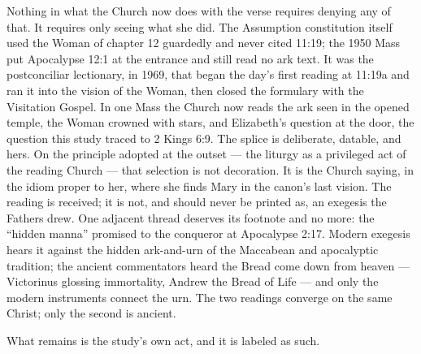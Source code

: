 Nothing in what the Church now does with the verse requires denying any of
that. It requires only seeing what she did. The Assumption constitution
itself used the Woman of chapter 12 guardedly and never cited 11:19; the
1950 Mass put Apocalypse 12:1 at the entrance and still read no ark text.
It was the postconciliar lectionary, in 1969, that began the day's first
reading at 11:19a and ran it into the vision of the Woman, then closed the
formulary with the Visitation Gospel. In one Mass the Church now reads the
ark seen in the opened temple, the Woman crowned with stars, and
Elizabeth's question at the door, the question this study traced to 2 Kings
6:9. The splice is deliberate, datable, and hers. On the principle adopted
at the outset --- the liturgy as a privileged act of the reading Church
--- that selection is not decoration. It is the Church saying, in the
idiom proper to her, where she finds Mary in the canon's last vision. The
reading is received; it is not, and should never be printed as, an
exegesis the Fathers drew. One adjacent thread deserves its footnote
and no more: the ``hidden manna'' promised to the conqueror at Apocalypse
2:17. Modern exegesis hears it against the hidden ark-and-urn of the
Maccabean and apocalyptic tradition; the ancient commentators heard the
Bread come down from heaven --- Victorinus glossing immortality, Andrew the
Bread of Life --- and only the modern instruments connect the urn. The two
readings converge on the same Christ; only the second is
ancient.

What remains is the study's own act, and it is labeled as
such.

